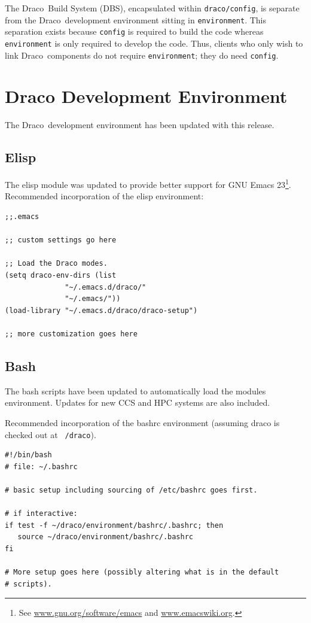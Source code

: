 \documentclass[note]{ResearchNote_pdf}
\newcommand{\draco}{Draco}
\begin{document}
The \draco\ Build System (DBS), encapsulated within
\texttt{draco/config}, is separate from the \draco\ development
environment sitting in \texttt{environment}.  This separation exists
because \texttt{config} is required to build the code whereas
\texttt{environment} is only required to develop the code.  Thus,
clients who only wish to link \draco\ components do not require
\texttt{environment}; they do need \texttt{config}.

\section{Draco Development Environment}

The \draco\ development environment has been updated with this
release.  

\subsection{Elisp}

The elisp module was updated to provide better support for GNU Emacs
23\footnote{See \url{www.gnu.org/software/emacs} and
  \url{www.emacswiki.org}.}. Recommended incorporation of the elisp
environment:
\begin{lstlisting}[basicstyle=\footnotesize, xleftmargin=0.5in, 
  xrightmargin=0.5in]
;;.emacs

;; custom settings go here

;; Load the Draco modes.
(setq draco-env-dirs (list
		      "~/.emacs.d/draco/"
		      "~/.emacs/"))
(load-library "~/.emacs.d/draco/draco-setup")

;; more customization goes here
\end{lstlisting}

\subsection{Bash}

The bash scripts have been updated to automatically load the modules
environment.  Updates for new CCS and HPC systems are also included.

Recommended incorporation of the bashrc environment (assuming draco is
checked out at \texttt{~/draco}).
\begin{lstlisting}[basicstyle=\footnotesize, xleftmargin=0.5in, 
  xrightmargin=0.5in]
#!/bin/bash
# file: ~/.bashrc

# basic setup including sourcing of /etc/bashrc goes first.

# if interactive:
if test -f ~/draco/environment/bashrc/.bashrc; then
   source ~/draco/environment/bashrc/.bashrc
fi

# More setup goes here (possibly altering what is in the default
# scripts). 
\end{lstlisting}
\end{document}
